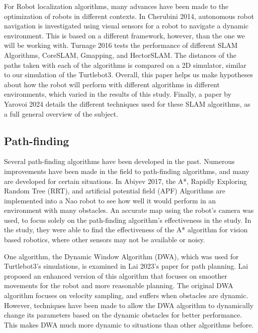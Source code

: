 \documentclass{article}
\begin{document}

For Robot localization algorithms, many advances have been made to the optimization of robots in different contexts. In Cherubini 2014, autonomous robot navigation is investigated using visual sensors for a robot to navigate a dynamic environment. This is based on a different framework, however, than the one we will be working with. Turnage 2016 tests the performance of different SLAM Algorithms, CoreSLAM, Gmapping, and HectorSLAM. The distances of the paths taken with each of the algorithms is compared on a 2D simulator, similar to our simulation of the Turtlebot3. Overall, this paper helps us make hypotheses about how the robot will perform with different algorithms in different environments, which varied in the results of this study. Finally, a paper by Yarovoi 2024 details the different techniques used for these SLAM algorithms, as a full general overview of the subject.


\subsection{Path-finding}


Several path-finding algorithms have been developed in the past. Numerous improvements have been made in the field to path-finding algorithms, and many are developed for certain situations. In Abiyev 2017, the A*, Rapidly Exploring Random Tree (RRT), and artificial potential field (APF) Algorithms are implemented into a Nao robot to see how well it would perform in an environment with many obstacles. An accurate map using the robot's camera was used, to focus solely on the path-finding algorithm's effectiveness in the study. In the study, they were able to find the effectiveness of the A* algorithm for vision based robotics, where other sensors may not be available or noisy. 

One algorithm, the Dynamic Window Algorithm (DWA), which was used for Turtlebot3's simulations, is examined in Lai 2023's paper for path planning. Lai proposed an enhanced version of this algorithm that focuses on smoother movements for the robot and more reasonable planning. The original DWA algorithm focuses on velocity sampling, and suffers when obstacles are dynamic. However, techniques have been made to allow the DWA algorithm to dynamically change its parameters based on the dynamic obstacles for better performance. This makes DWA much more dynamic to situations than other algorithms before. 
\end{document}
